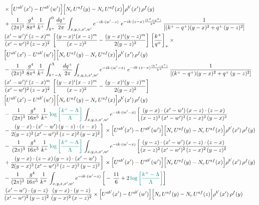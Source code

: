 \documentclass[9pt]{article}
\numberwithin{equation}{section}
\begin{document}
\begin{align}
&\times\Big[U^{ab'}(x')-U^{ab'}(w')\Big]\Big[N_{c}\,U^{af}(y)-N_{c}\,U^{af}(x)\Big]\rho^{b'}(x')\,\rho^{f}(y)\notag \\ & + \frac{1}{(2\pi)^{3}}\,\frac{g^{4}}{8\pi^{4}}\,\frac{1}{k^{+}}\int_{k^{+}}^{0}\frac{dq^{+}}{2\pi}\int_{x,y,z,x',w'}e^{-ik\cdot(w'-z)}\ e^{-ik\cdot(z-x)\frac{(k^{+}-q^{+})}{k^{+}}}\,\frac{1}{\left[(k^{+}-q^{+})(y-x)^{2}+q^{+}\,(y-z)^{2}\right]}\notag \\ & \frac{(x'-w')^{i}\,(z-x)^{m}}{(x'-w')^{2}\,(z-x)^{2}}\,\left[\frac{(y-x)^{i}(x-z)^{m}}{(x-z)^{2}}-\frac{(y-x)^{i}(y-z)^{m}}{2(y-z)^{2}}\right]\,\left[\frac{k^{+}}{q^{+}}\right]_{+}\times\notag \\ & \Big[U^{ab'}(x')-U^{ab'}(w')\Big]\Big[N_{c}\,U^{af}(y)-N_{c}\,U^{af}(x)\Big]\rho^{b'}(x')\,\rho^{f}(y)\notag \\ & - \frac{1}{(2\pi)^{3}}\,\frac{g^{4}}{8\pi^{4}}\,\frac{1}{k^{+}}\int_{k^{+}-\Lambda}^{\Lambda}\frac{dq^{+}}{2\pi}\int_{x,y,z,x',w'}e^{-ik\cdot(w'-z)}\ e^{-ik\cdot(z-x)\frac{(k^{+}-q^{+})}{k^{+}}}\,\frac{1}{\left[(k^{+}-q^{+})(y-x)^{2}+q^{+}\,(y-z)^{2}\right]}\notag \\ & \frac{(x'-w')^{i}\,(z-x)^{m}}{(x'-w')^{2}\,(z-x)^{2}}\,\left[\frac{(y-x)^{i}(x-z)^{m}}{(x-z)^{2}}-\frac{(y-x)^{i}(y-z)^{m}}{2(y-z)^{2}}\right]\notag \\ & \Big[U^{ab'}(x')-U^{ab'}(w')\Big]\Big[N_{c}\,U^{af}(y)-N_{c}\,U^{af}(x)\Big]\rho^{b'}(x')\,\rho^{f}(y)\notag \\ & -\, \frac{1}{(2\pi)^{3}}\,\frac{g^{4}}{16\pi^{5}}\,\frac{1}{k^{+}}\,{\color{teal}\log{\left[\frac{k^{+}-\Lambda}{\Lambda}\right]}}\,\int_{x,y,z,x',w'}e^{-ik\cdot(w'-x)}\, \bigg[\frac{(y-x)\cdot (x'-w')\,(x-z)\cdot (z-x)}{(x-z)^{2}\,(x'-w')^{2}\,(z-x)^{2}\,(y-x)^{2}}\notag \\ & -\frac{(y-x)\cdot (x'-w')\,(y-z)\cdot (z-x)}{2(y-z)^{2}\,(x'-w')^{2}\,(z-x)^{2}\,(y-x)^{2}}\bigg]\,\times \Big[U^{ab'}(x')-U^{ab'}(w')\Big]\Big[N_{c}\,U^{af}(y)-N_{c}\,U^{af}(x)\Big]\rho^{b'}(x')\,\rho^{f}(y)\notag \\ & -\, \frac{1}{(2\pi)^{3}}\,\frac{g^{4}}{16\pi^{5}}\,\frac{1}{k^{+}}\,{\color{teal}\log{\left[\frac{k^{+}-\Lambda}{\Lambda}\right]}}\,\int_{x,y,z,x',w'}e^{-ik\cdot(w'-z)}\,\bigg[\frac{(y-z)\cdot (x'-w')\,(x-z)\cdot (z-x)}{(x-z)^{2}\,(x'-w')^{2}\,(z-x)^{2}\,(y-z)^{2}}\notag \\ & +\frac{(y-x)\cdot (z-x)\,(y-z)\cdot (x'-w')}{2(y-x)^{2}\,(x'-w')^{2}\,(z-x)^{2}\,(y-z)^{2}}\bigg]\,\times \Big[U^{ab'}(x')-U^{ab'}(w')\Big]\Big[N_{c}\,U^{af}(y)-N_{c}\,U^{af}(x)\Big]\rho^{b'}(x')\,\rho^{f}(y)\notag \\ & - \frac{1}{(2\pi)^{3}}\,\frac{g^{4}}{16\pi^{5}}\,\frac{1}{k^{+}}\,\int_{x,y,z,x',w'}e^{-ik\cdot(w'-z)}\,\bigg[-\,\frac{11}{6}+2\,{\color{teal}\log{\left[\frac{k^{+}-\Lambda}{\Lambda}\right]}}\bigg]\notag \\ & \frac{(x'-w')\cdot(y-z)}{(x'-w')^{2}\,(y-z)^{2}}\,\frac{(y-x)\cdot(y-z)}{(y-x)^{2}\,(x-z)^{2}}\times\Big[U^{ab'}(x')-U^{ab'}(w')\Big]\Big[N_{c}\,U^{af}(y)-N_{c}\,U^{af}(z)\Big]\rho^{b'}(x')\,\rho^{f}(y)
\end{align}
\end{document}
